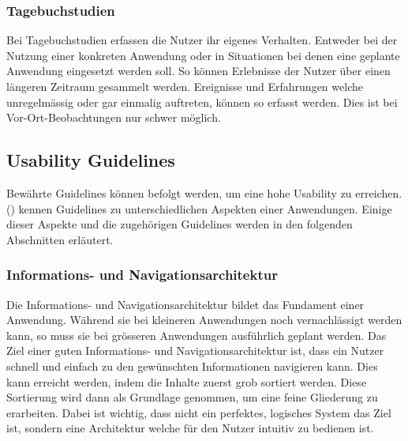 \subsubsection{Tagebuchstudien}\label{tagebuchstudien}
Bei Tagebuchstudien erfassen die Nutzer ihr eigenes Verhalten.
Entweder bei der Nutzung einer konkreten Anwendung oder in Situationen bei denen eine geplante Anwendung eingesetzt werden soll.
So können Erlebnisse der Nutzer über einen längeren Zeitraum gesammelt werden.
Ereignisse und Erfahrungen welche unregelmässig oder gar einmalig auftreten, können so erfasst werden.
Dies ist bei Vor-Ort-Beobachtungen nur schwer möglich.

\subsection{Usability Guidelines}\label{guidelines}
Bewährte Guidelines können befolgt werden, um eine hohe Usability zu erreichen.
\citeauthor{usability} (\citeyear{usability}) kennen Guidelines zu unterschiedlichen Aspekten einer Anwendungen.
Einige dieser Aspekte und die zugehörigen Guidelines werden in den folgenden Abschnitten erläutert.

\subsubsection{Informations- und Navigationsarchitektur}
Die Informations- und Navigationsarchitektur bildet das Fundament einer Anwendung.
Während sie bei kleineren Anwendungen noch vernachlässigt werden kann, so muss sie bei grösseren Anwendungen ausführlich geplant werden.
Das Ziel einer guten Informations- und Navigationsarchitektur ist, dass ein Nutzer schnell und einfach zu den gewünschten Informationen navigieren kann.
Dies kann erreicht werden, indem die Inhalte zuerst grob sortiert werden.
Diese Sortierung wird dann als Grundlage genommen, um eine feine Gliederung zu erarbeiten.
Dabei ist wichtig, dass nicht ein perfektes, logisches System das Ziel ist, sondern eine Architektur welche für den Nutzer intuitiv zu bedienen ist.


